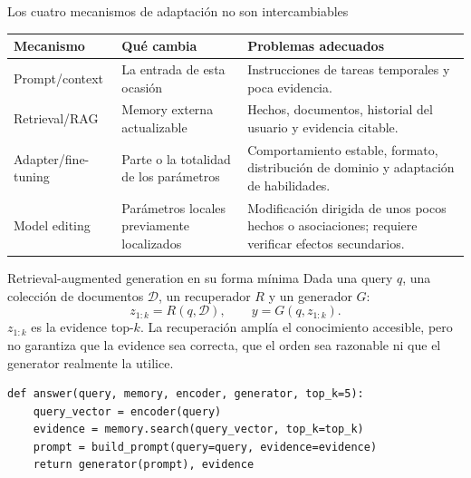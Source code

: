 

\begin{importantbox}{Los cuatro mecanismos de adaptación no son intercambiables}
\begin{tabularx}{\textwidth}{L{0.19\textwidth} L{0.24\textwidth} X}
\toprule
Mecanismo & Qué cambia & Problemas adecuados \\
\midrule
Prompt/context & La entrada de esta ocasión & Instrucciones de tareas temporales y poca evidencia. \\
Retrieval/RAG & Memory externa actualizable & Hechos, documentos, historial del usuario y evidencia citable. \\
Adapter/fine-tuning & Parte o la totalidad de los parámetros & Comportamiento estable, formato, distribución de dominio y adaptación de habilidades. \\
Model editing & Parámetros locales previamente localizados & Modificación dirigida de unos pocos hechos o asociaciones; requiere verificar efectos secundarios. \\
\bottomrule
\end{tabularx}
\end{importantbox}

\begin{importantbox}{Retrieval-augmented generation en su forma mínima}
Dada una query $q$, una colección de documentos $\mathcal{D}$, un recuperador $R$ y un generador $G$:
\[
z_{1:k}=R(q,\mathcal{D}),\qquad y=G(q,z_{1:k}).
\]
$z_{1:k}$ es la evidence top-$k$. La recuperación amplía el conocimiento accesible, pero no garantiza que la evidence sea correcta, que el orden sea razonable ni que el generator realmente la utilice.
\end{importantbox}

\begin{lstlisting}[caption={Flujo mínimo de recuperación desde memoria externa y generación}]
def answer(query, memory, encoder, generator, top_k=5):
    query_vector = encoder(query)
    evidence = memory.search(query_vector, top_k=top_k)
    prompt = build_prompt(query=query, evidence=evidence)
    return generator(prompt), evidence
\end{lstlisting}

